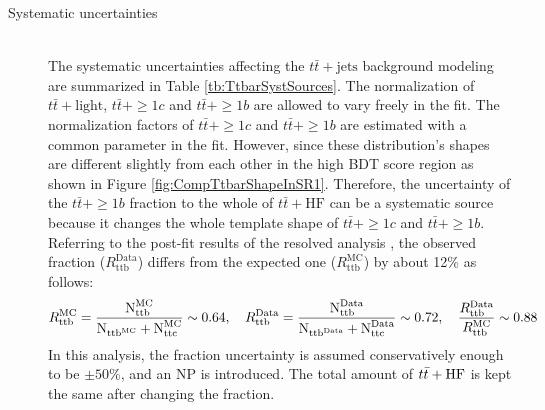 \begin{description}
  \item[Systematic uncertainties] \mbox{}\\
    The systematic uncertainties affecting the $t\bar{t}+\text{jets}$ background modeling are summarized in Table \ref{tb:TtbarSystSources}. 
    The normalization of $t\bar{t}+\text{light}$, $t\bar{t}+\geq1c$ and $t\bar{t}+\geq1b$ are allowed to vary freely in the fit. The normalization factors of $t\bar{t}+\geq1c$ and $t\bar{t}+\geq1b$ are estimated with a common parameter in the fit. However, since these distribution's shapes are different slightly from each other in the high BDT score region as shown in Figure \ref{fig:CompTtbarShapeInSR1}. Therefore, the uncertainty of the $t\bar{t}+\geq1b$ fraction to the whole of $t\bar{t}+\text{HF}$ can be a systematic source because it changes the whole template shape of $t\bar{t}+\geq1c$ and $t\bar{t}+\geq1b$. Referring to the post-fit results of the resolved analysis \cite{HDBS-2021-02}, the observed fraction ($R_{\text{ttb}}^{\text{Data}}$) differs from the expected one ($R_{\text{ttb}}^{\text{MC}}$) by about 12\% as follows:
    \begin{alignat}{1}
        R_{\text{ttb}}^{\text{MC}} = \frac{\text{N}_{\text{ttb}}^{\text{MC}}}{\text{N}_{\text{ttb}^{\text{MC}}} + \text{N}_{\text{ttc}}^{\text{MC}}} \sim 0.64,
        \quad R_{\text{ttb}}^{\text{Data}} = \frac{\text{N}_{\text{ttb}}^{\text{Data}}}{\text{N}_{\text{ttb}^{\text{Data}}} + \text{N}_{\text{ttc}}^{\text{Data}}} & \sim 0.72,
        \quad \frac{R_{\text{ttb}}^{\text{Data}}}{R_{\text{ttb}}^{\text{MC}}} \sim 0.88 \notag
    \end{alignat}
    In this analysis, the fraction uncertainty is assumed conservatively enough to be $\pm 50\%$, and an NP is introduced. The total amount of $t\Bar{t}+\text{HF}$ is kept the same after changing the fraction.
    

\end{description}
